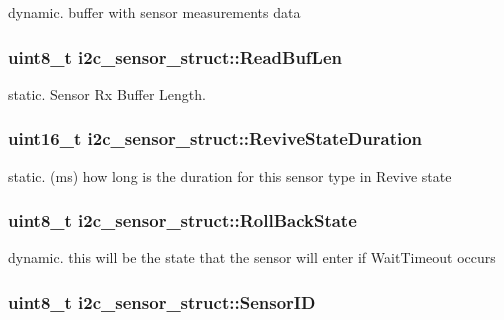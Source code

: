 dynamic. buffer with sensor measurements data \hypertarget{structi2c__sensor__struct_a96b071cb102054fff1f7a2b2a08b410c}{
\subsubsection[{Read\-Buf\-Len}]{\setlength{\rightskip}{0pt plus 5cm}uint8\-\_\-t i2c\-\_\-sensor\-\_\-struct\-::\-Read\-Buf\-Len}}\label{structi2c__sensor__struct_a96b071cb102054fff1f7a2b2a08b410c}
static. Sensor Rx Buffer Length. \hypertarget{structi2c__sensor__struct_a2eba87600a92380090f4ebe4b9358c55}{
\subsubsection[{Revive\-State\-Duration}]{\setlength{\rightskip}{0pt plus 5cm}uint16\-\_\-t i2c\-\_\-sensor\-\_\-struct\-::\-Revive\-State\-Duration}}\label{structi2c__sensor__struct_a2eba87600a92380090f4ebe4b9358c55}
static. (ms) how long is the duration for this sensor type in Revive state \hypertarget{structi2c__sensor__struct_ad1df590b17f69baaa39342db03b12203}{
\subsubsection[{Roll\-Back\-State}]{\setlength{\rightskip}{0pt plus 5cm}uint8\-\_\-t i2c\-\_\-sensor\-\_\-struct\-::\-Roll\-Back\-State}}\label{structi2c__sensor__struct_ad1df590b17f69baaa39342db03b12203}
dynamic. this will be the state that the sensor will enter if Wait\-Timeout occurs \hypertarget{structi2c__sensor__struct_aa896d54931e09cfaf3e682349ff67ebc}{
\subsubsection[{Sensor\-I\-D}]{\setlength{\rightskip}{0pt plus 5cm}uint8\-\_\-t i2c\-\_\-sensor\-\_\-struct\-::\-Sensor\-I\-D}}\label{structi2c__sensor__struct_aa896d54931e09cfaf3e682349ff67ebc}
